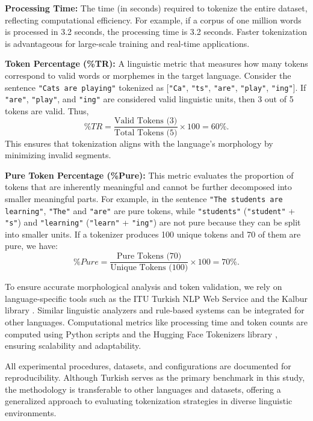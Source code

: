 \textbf{Processing Time:}  
The time (in seconds) required to tokenize the entire dataset, reflecting computational efficiency. For example, if a corpus of one million words is processed in 3.2 seconds, the processing time is 3.2 seconds. Faster tokenization is advantageous for large-scale training and real-time applications.

\textbf{Token Percentage (\%TR):}  
A linguistic metric that measures how many tokens correspond to valid words or morphemes in the target language. Consider the sentence \texttt{"Cats are playing"} tokenized as [\texttt{"Ca"}, \texttt{"ts"}, \texttt{"are"}, \texttt{"play"}, \texttt{"ing"}]. If \texttt{"are"}, \texttt{"play"}, and \texttt{"ing"} are considered valid linguistic units, then 3 out of 5 tokens are valid. Thus,  
\[
\%TR = \frac{\text{Valid Tokens (3)}}{\text{Total Tokens (5)}} \times 100 = 60\%.
\]
This ensures that tokenization aligns with the language’s morphology by minimizing invalid segments.

\textbf{Pure Token Percentage (\%Pure):}  
This metric evaluates the proportion of tokens that are inherently meaningful and cannot be further decomposed into smaller meaningful parts. For example, in the sentence \texttt{"The students are learning"}, \texttt{"The"} and \texttt{"are"} are pure tokens, while \texttt{"students"} (\texttt{"student"} + \texttt{"s"}) and \texttt{"learning"} (\texttt{"learn"} + \texttt{"ing"}) are not pure because they can be split into smaller units. If a tokenizer produces 100 unique tokens and 70 of them are pure, we have:  
\[
\%Pure = \frac{\text{Pure Tokens (70)}}{\text{Unique Tokens (100)}} \times 100 = 70\%.
\]

To ensure accurate morphological analysis and token validation, we rely on language-specific tools such as the ITU Turkish NLP Web Service \cite{eryigit_itu_2014} and the Kalbur library \cite{aksoy_ahmetaxkalbur_2024}. Similar linguistic analyzers and rule-based systems can be integrated for other languages. Computational metrics like processing time and token counts are computed using Python scripts and the Hugging Face Tokenizers library \cite{neubeck_so_2024}, ensuring scalability and adaptability.

All experimental procedures, datasets, and configurations are documented for reproducibility. Although Turkish serves as the primary benchmark in this study, the methodology is transferable to other languages and datasets, offering a generalized approach to evaluating tokenization strategies in diverse linguistic environments.